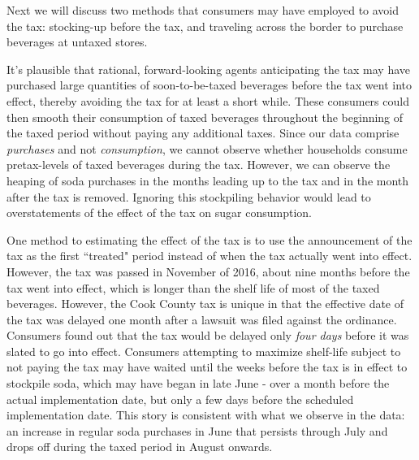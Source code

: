 \documentclass[12pt]{article}
\begin{document}


Next we will discuss two methods that consumers may have employed to avoid the tax: stocking-up before the tax, and traveling across the border to purchase beverages at untaxed stores.

It's plausible that rational, forward-looking agents anticipating the tax may have purchased large quantities of soon-to-be-taxed beverages before the tax went into effect, thereby avoiding the tax for at least a short while. These consumers could then smooth their consumption of taxed beverages throughout the beginning of the taxed period without paying any additional taxes. Since our data comprise \textit{purchases} and not \textit{consumption}, we cannot observe whether households consume pretax-levels of taxed beverages during the tax. However, we can observe the heaping of soda purchases in the months leading up to the tax and in the month after the tax is removed. Ignoring this stockpiling behavior would lead to overstatements of the effect of the tax on sugar consumption.

One method to estimating the effect of the tax is to use the announcement of the tax as the first ``treated" period instead of when the tax actually went into effect. However, the tax was passed in November of 2016, about nine months before the tax went into effect, which is longer than the shelf life of most of the taxed beverages. However, the Cook County tax is unique in that the effective date of the tax was delayed one month after a lawsuit was filed against the ordinance. Consumers found out that the tax would be delayed only \textit{four days} before it was slated to go into effect. Consumers attempting to maximize shelf-life subject to not paying the tax may have waited until the weeks before the tax is in effect to stockpile soda, which may have began in late June - over a month before the actual implementation date, but only a few days before the scheduled implementation date. This story is consistent with what we observe in the data: an increase in regular soda purchases in June that persists through July and drops off during the taxed period in August onwards.
\end{document}
